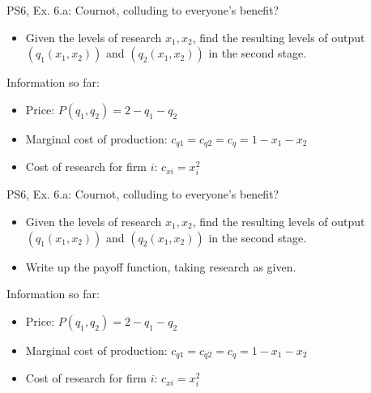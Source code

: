 \begin{frame}{PS6, Ex. 6.a: Cournot, colluding to everyone's benefit?}
    \begin{itemize}
    \item[(a)] Given the levels of research $x_1,x_2$, find the resulting levels of output $(q_1(x_1, x_2))$ and $(q_2(x_1, x_2))$ in the second stage.
    \end{itemize}
  \begin{multicols}{2}
    \vfill\null \columnbreak
    Information so far:
    \begin{itemize}
      \item[1] Price: $P(q_1,q_2)=2-q_1-q_2$
      \item[2] Marginal cost of production: $c_{q1} = c_{q2} = c_q =1 - x_1 - x_2$
      \item[3] Cost of research for firm $i$: $c_{xi}=x_i^2$
    \end{itemize}
    \vfill\null
  \end{multicols}
\end{frame}
\begin{frame}{PS6, Ex. 6.a: Cournot, colluding to everyone's benefit?}
    \begin{itemize}
    \item[(a)] Given the levels of research $x_1,x_2$, find the resulting levels of output $(q_1(x_1, x_2))$ and $(q_2(x_1, x_2))$ in the second stage.
    \end{itemize}
  \begin{multicols}{2}
    \begin{itemize}
      \item[(Step a)] Write up the payoff function, taking research as given.
    \end{itemize}
    \vfill\null \columnbreak
    Information so far:
    \begin{itemize}
      \item[1] Price: $P(q_1,q_2)=2-q_1-q_2$
      \item[2] Marginal cost of production: $c_{q1} = c_{q2} = c_q =1 - x_1 - x_2$
      \item[3] Cost of research for firm $i$: $c_{xi}=x_i^2$
    \end{itemize}
    \vfill\null
  \end{multicols}
\end{frame}
